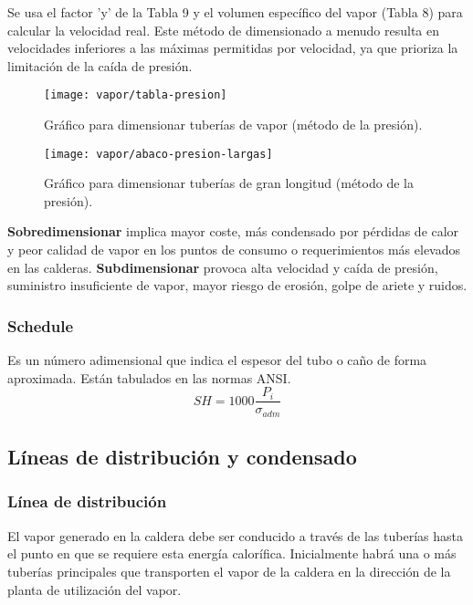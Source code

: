 \begin{itemize}
\begin{enumerate}
            Se usa el factor 'y' de la Tabla 9 y el volumen específico del vapor (Tabla 8) para calcular la velocidad real. Este método de dimensionado a menudo resulta en velocidades inferiores a las máximas permitidas por velocidad, ya que prioriza la limitación de la caída de presión.
        \end{enumerate}
         \begin{figure}[H]
            \centering
            \caption{Gráfico para dimensionar tuberías de vapor (método de la presión).} \label{fig:abaco-presion}
            \texttt{[image: vapor/tabla-presion]}
        \end{figure}
         \begin{figure}[H]
            \centering
            \caption{Gráfico para dimensionar tuberías de gran longitud (método de la presión).} \label{fig:abaco-presion-largas}
            \texttt{[image: vapor/abaco-presion-largas]}
        \end{figure}
    \end{itemize}
    
    \textbf{Sobredimensionar} implica mayor coste, más condensado por pérdidas de calor y peor calidad de vapor en los puntos de consumo o requerimientos más elevados en las calderas. \textbf{Subdimensionar} provoca alta velocidad y caída de presión, suministro insuficiente de vapor, mayor riesgo de erosión, golpe de ariete y ruidos. 
    
    \subsubsection{Schedule}
    Es un número adimensional que indica el espesor del tubo o caño de forma aproximada. Están tabulados en las normas ANSI.
    \[SH=1000\dfrac{P_i}{\sigma_{adm}}\]

\subsection{Líneas de distribución y condensado}
\subsubsection{Línea de distribución}
    El vapor generado en la caldera debe ser conducido a través de las tuberías hasta el punto en que se requiere esta energía calorífica. Inicialmente habrá una o más tuberías principales que transporten el vapor de la caldera en la dirección de la planta de utilización del vapor. 

